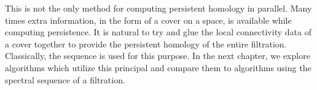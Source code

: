 This is not the only method for computing persistent homology in parallel. Many times extra information, in the form of a cover on a space, is available while computing persistence. It is natural to try and glue the local connectivity data of a cover together to provide the persistent homology of the entire filtration. Classically, the \mv sequence is used for this purpose. In the next chapter, we explore algorithms which utilize this principal and compare them to algorithms using the spectral sequence of a filtration.  